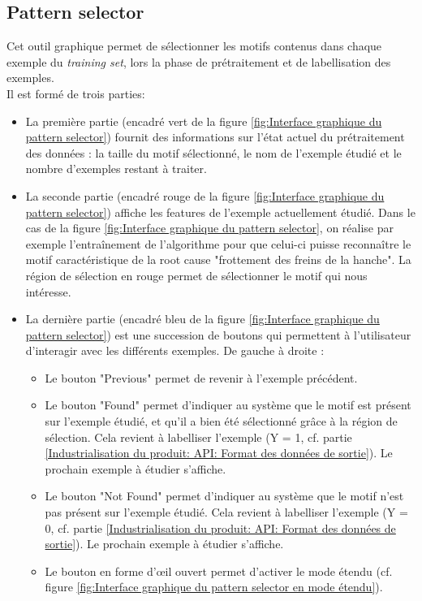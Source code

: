\subsection{Pattern selector}
\label{Industrialisation du produit: Outils graphiques: Pattern selection}
Cet outil graphique permet de sélectionner les motifs contenus dans chaque exemple du \emph{training set}, lors la phase de prétraitement  et de labellisation des exemples. \\
Il est formé de trois parties:
\begin{itemize}
	\item La première partie (encadré vert de la figure \ref{fig:Interface graphique du pattern selector}) fournit des informations sur l'état actuel du prétraitement des données : la taille du motif sélectionné, le nom de l'exemple étudié et le nombre d'exemples restant à traiter. 
	\item La seconde partie (encadré rouge de la figure  \ref{fig:Interface graphique du pattern selector}) affiche les features de l'exemple actuellement étudié. Dans le cas de la figure  \ref{fig:Interface graphique du pattern selector}, on réalise par exemple l'entraînement de l'algorithme pour que celui-ci puisse reconnaître le motif caractéristique de la root cause "frottement des freins de la hanche". La région de sélection en rouge permet de sélectionner le motif qui nous intéresse.
	\item La dernière partie (encadré bleu de la figure  \ref{fig:Interface graphique du pattern selector}) est une succession de boutons qui permettent à l'utilisateur d'interagir avec les différents exemples. De gauche à droite :   
	\begin{itemize}
		\item Le  bouton "Previous" permet de revenir à l'exemple précédent.
		\item Le bouton "Found" permet d'indiquer au système que le motif est présent sur l'exemple étudié, et qu'il a bien été sélectionné grâce à la région de sélection. Cela revient à labelliser l'exemple (Y = 1, cf. partie \ref{Industrialisation du produit: API: Format des données de sortie}). Le prochain exemple à étudier s'affiche.
		\item Le bouton "Not Found" permet d'indiquer au système que le motif n'est pas présent sur l'exemple étudié. Cela revient à labelliser l'exemple (Y = 0, cf. partie \ref{Industrialisation du produit: API: Format des données de sortie}). Le prochain exemple à étudier s'affiche.
		\item Le bouton en forme d'œil ouvert permet d'activer le mode étendu (cf. figure \ref{fig:Interface graphique du pattern selector en mode étendu}).
	\end{itemize} 
\end{itemize} 

